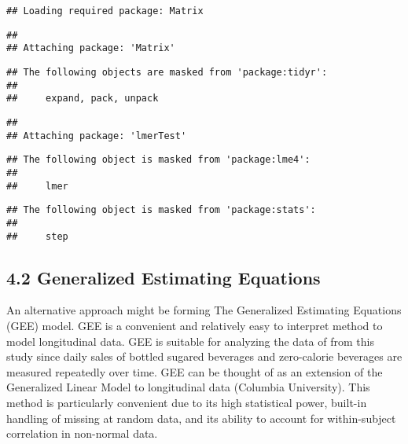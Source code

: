 \documentclass[
]{article}
\begin{document}
\begin{verbatim}
## Loading required package: Matrix
\end{verbatim}

\begin{verbatim}
## 
## Attaching package: 'Matrix'
\end{verbatim}

\begin{verbatim}
## The following objects are masked from 'package:tidyr':
## 
##     expand, pack, unpack
\end{verbatim}

\begin{verbatim}
## 
## Attaching package: 'lmerTest'
\end{verbatim}

\begin{verbatim}
## The following object is masked from 'package:lme4':
## 
##     lmer
\end{verbatim}

\begin{verbatim}
## The following object is masked from 'package:stats':
## 
##     step
\end{verbatim}

\hypertarget{generalized-estimating-equations}{%
\subsection{4.2 Generalized Estimating Equations}\label{generalized-estimating-equations}}

An alternative approach might be forming The Generalized Estimating Equations (GEE) model. GEE is a convenient and relatively easy to interpret method to model longitudinal data. GEE is suitable for analyzing the data of from this study since daily sales of bottled sugared beverages and zero-calorie beverages are measured repeatedly over time. GEE can be thought of as an extension of the Generalized Linear Model to longitudinal data (Columbia University). This method is particularly convenient due to its high statistical power, built-in handling of missing at random data, and its ability to account for within-subject correlation in non-normal data.
\end{document}
